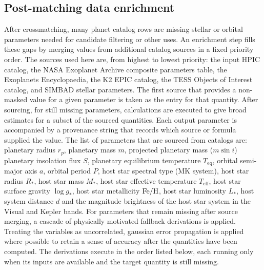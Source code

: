 \subsection{Post-matching data enrichment}
\label{sec:enrichment}
After crossmatching, many planet catalog rows are missing stellar or orbital parameters needed for candidate filtering or other uses. An enrichment step fills these gaps by merging values from additional catalog sources in a fixed priority order. The sources used here are, from highest to lowest priority: the input HPIC catalog, the NASA Exoplanet Archive composite parameters table, the Exoplanets Encyclopaedia, the K2 EPIC catalog, the TESS Objects of Interest catalog, and SIMBAD stellar parameters. The first source that provides a non-masked value for a given parameter is taken as the entry for that quantity. 
After sourcing, for still missing parameters, calculations are executed to give broad estimates for a subset of the sourced quantities. Each output parameter is accompanied by a provenance string that records which source or formula supplied the value.
The list of parameters that are sourced from catalogs are: planetary radius $r_p$, planetary mass $m$, projected planetary mass ($m \sin i $) planetary insolation flux $S$, planetary equilibrium temperature $T_\text{eq}$, orbital semi-major axis $a$, orbital period $P$, host star spectral type (MK system), host star radius $R_*$, host star mass $M_*$, host star effective temperature $T_\text{eff}$, host star surface gravity $\log g_*$, host star metallicity $\ce{Fe/H}$, host star luminosity $L_*$, host system distance $d$ and the magnitude brightness of the host star system in the Visual and Kepler bands.
For parameters that remain missing after source merging, a cascade of physically motivated fallback derivations is applied. Treating the variables as uncorrelated, gaussian error propagation is applied where possible to retain a sense of accuracy after the quantities have been computed. The derivations execute in the order listed below, each running only when its inputs are available and the target quantity is still missing.

